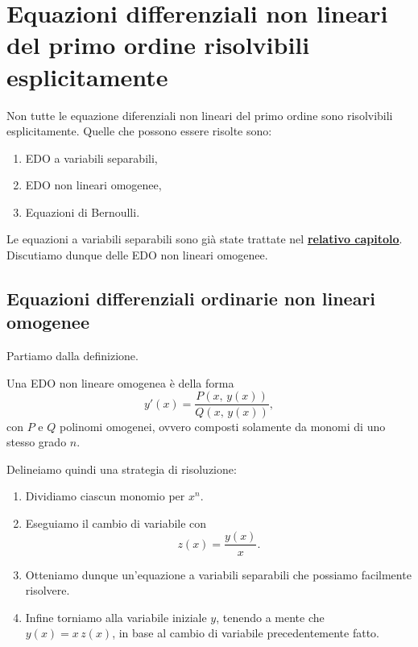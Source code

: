 \documentclass[../../analisi2]{subfiles}
\begin{document}
    \chapter{Equazioni differenziali non lineari del primo ordine risolvibili esplicitamente}

        Non tutte le equazione diferenziali non lineari del primo ordine sono risolvibili esplicitamente. Quelle che possono essere
        risolte sono:

        \begin{enumerate}
            \item EDO a variabili separabili,
            \item EDO non lineari omogenee,
            \item Equazioni di Bernoulli.
        \end{enumerate}

        Le equazioni a variabili separabili sono già state trattate nel \hyperref[cap:edoSeparabili]{\textbf{relativo capitolo}}.
        Discutiamo dunque delle EDO non lineari omogenee.

        \section{Equazioni differenziali ordinarie non lineari omogenee}

            Partiamo dalla definizione.

            \begin{definizione}
                Una EDO non lineare omogenea è della forma
                \[
                    y'(x) = \frac{P(x, \, y(x))}{Q(x, \, y(x))},
                \]
                con \(P\) e \(Q\) polinomi omogenei, ovvero composti solamente da monomi di uno stesso grado \(n\).
            \end{definizione}

            Delineiamo quindi una strategia di risoluzione:
            \begin{enumerate}
                \item Dividiamo ciascun monomio per \(x^n\).
                \item Eseguiamo il cambio di variabile con
                    \[
                        z(x) = \frac{y(x)}{x}.  
                    \]
                \item Otteniamo dunque un'equazione a variabili separabili che possiamo facilmente risolvere.
                \item Infine torniamo alla variabile iniziale \(y\), tenendo a mente che \(y(x) = x \, z(x)\), in base al cambio di
                    variabile precedentemente fatto.
            \end{enumerate}
\end{document}
